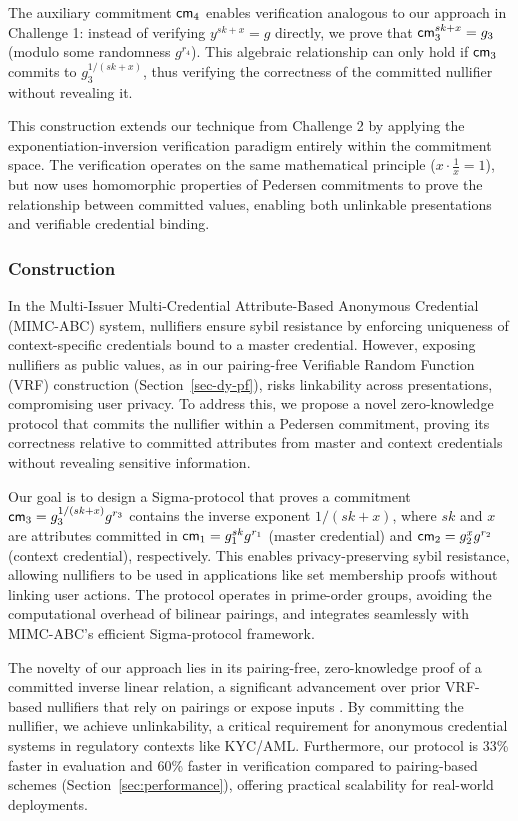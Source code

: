 The auxiliary commitment $\mathsf{cm}_4$ enables verification analogous to our approach in Challenge 1: instead of verifying $y^{sk+x} = g$ directly, we prove that $\mathsf{cm}_3^{sk+x} = g_3$ (modulo some randomness $g^{r_4}$). This algebraic relationship can only hold if $\mathsf{cm}_3$ commits to $g_3^{1/(sk+x)}$, thus verifying the correctness of the committed nullifier without revealing it.

This construction extends our technique from Challenge 2 by applying the exponentiation-inversion verification paradigm entirely within the commitment space. The verification operates on the same mathematical principle ($x \cdot \frac{1}{x} = 1$), but now uses homomorphic properties of Pedersen commitments to prove the relationship between committed values, enabling both unlinkable presentations and verifiable credential binding.



\subsubsection{Construction}\label{sec:committed-nullifier}


In the Multi-Issuer Multi-Credential Attribute-Based Anonymous Credential (MIMC-ABC) system, nullifiers ensure sybil resistance by enforcing uniqueness of context-specific credentials bound to a master credential. However, exposing nullifiers as public values, as in our pairing-free Verifiable Random Function (VRF) construction (Section~\ref{sec-dy-pf}), risks linkability across presentations, compromising user privacy. To address this, we propose a novel zero-knowledge protocol that commits the nullifier within a Pedersen commitment, proving its correctness relative to committed attributes from master and context credentials without revealing sensitive information.

Our goal is to design a Sigma-protocol that proves a commitment $\mathsf{cm}_3 = g_3^{1/(sk + x)} g^{r_3}$ contains the inverse exponent $1/(sk + x)$, where $sk$ and $x$ are attributes committed in $\mathsf{cm}_1 = g_1^{sk} g^{r_1}$ (master credential) and $\mathsf{cm}_2 = g_2^{x} g^{r_2}$ (context credential), respectively. This enables privacy-preserving sybil resistance, allowing nullifiers to be used in applications like set membership proofs without linking user actions. The protocol operates in prime-order groups, avoiding the computational overhead of bilinear pairings, and integrates seamlessly with MIMC-ABC's efficient Sigma-protocol framework.

The novelty of our approach lies in its pairing-free, zero-knowledge proof of a committed inverse linear relation, a significant advancement over prior VRF-based nullifiers that rely on pairings or expose inputs \cite{hutchison_verifiable_2005,tomescu2022utt}. By committing the nullifier, we achieve unlinkability, a critical requirement for anonymous credential systems in regulatory contexts like KYC/AML. Furthermore, our protocol is 33\% faster in evaluation and 60\% faster in verification compared to pairing-based schemes (Section~\ref{sec:performance}), offering practical scalability for real-world deployments.

